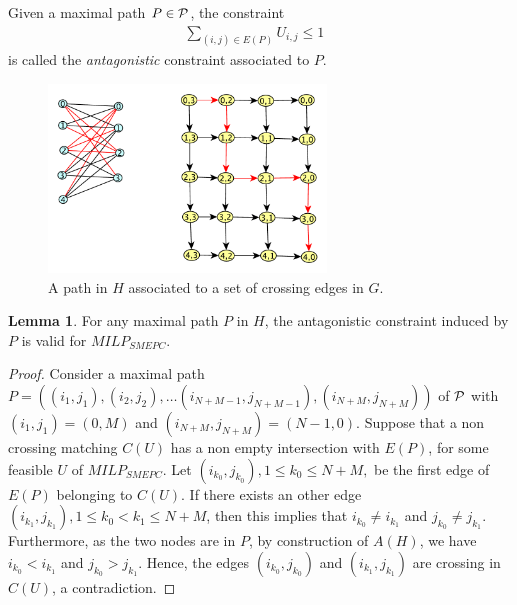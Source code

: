 \documentclass[11pt]{article}
\theoremstyle{plain}%
\theoremstyle{definition} \newtheorem{lem}{Lemma}[section]
\theoremstyle{definition} \newtheorem{claim}{Claim}[lem]
\theoremstyle{definition} \newtheorem{theorem}{Theorem}[section]
\theoremstyle{definition} \newtheorem{exo}{Exercice n$^\circ$}
\theoremstyle{definition} \newtheorem{quest}{}[exo]
\theoremstyle{definition} \newtheorem{sousquest}{}[quest]
\theoremstyle{remark}
\theoremstyle{definition}
\begin{document}
Given a maximal path $P \in {\cal P}$,  the constraint 
\begin{eqnarray}
 \sum_{(i, j) \in E(P)} U_{i,j} \le 1 &\label{clique_antag_P}
\end{eqnarray}
is called the {\it antagonistic} constraint associated to $P$. 
\begin{figure}[!ht]
	\centerline{
		\includegraphics[height=50mm]{NonCrossingM.pdf}}
	\caption[]{A path in $H$ associated to a set of crossing edges in $G$.}
	\label{NCM}
\end{figure}
\begin{lem}\label{lem_antcste}
For any maximal path $P$ in $H$, the antagonistic constraint induced by $P$ is valid for $MILP_{SMEPC}$.
\end{lem}
\begin{proof}
Consider a maximal path $P =( (i_1, j_1), (i_2, j_2), \dots (i_{N+M-1}, j_{N+M-1}), (i_{N+M}, j_{N+M}))$ of ${\cal P}$
with $(i_1, j_1)=(0,M)$ and $(i_{N+M}, j_{N+M})=(N-1, 0)$. Suppose that a non crossing matching $C(U)$ has a non empty
intersection with $E(P)$, for some feasible $U$ of $MILP_{SMEPC}$. Let $(i_{k_0},j_{k_0}), 1 \le k_0 \le N+M,$ be the first edge of $E(P)$ belonging to $C(U)$.
If there exists an other edge   $(i_{k_1},j_{k_1}), 1 \le k_0 < k_1 \le N+M$, then this implies that $ i_{k_0} \neq i_{k_1}$ and
$ j_{k_0} \neq j_{k_1}$. Furthermore, as the two nodes are in $P$, by construction of $A(H)$, 
we have $ i_{k_0} < i_{k_1}$ and $ j_{k_0} > j_{k_1}$. Hence, the edges $(i_{k_0},j_{k_0})$ and
$(i_{k_1},j_{k_1})$ are crossing in $C(U)$, a contradiction.
\end{proof}

\end{document}
